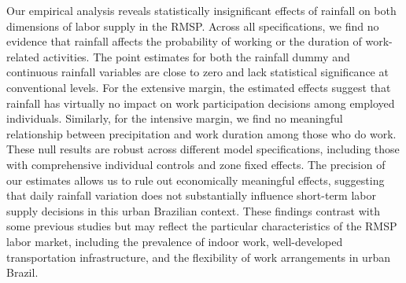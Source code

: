 Our empirical analysis reveals statistically insignificant effects of rainfall on both dimensions of labor supply in the RMSP. Across all specifications, we find no evidence that rainfall affects the probability of working or the duration of work-related activities. The point estimates for both the rainfall dummy and continuous rainfall variables are close to zero and lack statistical significance at conventional levels. For the extensive margin, the estimated effects suggest that rainfall has virtually no impact on work participation decisions among employed individuals. Similarly, for the intensive margin, we find no meaningful relationship between precipitation and work duration among those who do work. These null results are robust across different model specifications, including those with comprehensive individual controls and zone fixed effects. The precision of our estimates allows us to rule out economically meaningful effects, suggesting that daily rainfall variation does not substantially influence short-term labor supply decisions in this urban Brazilian context. These findings contrast with some previous studies but may reflect the particular characteristics of the RMSP labor market, including the prevalence of indoor work, well-developed transportation infrastructure, and the flexibility of work arrangements in urban Brazil.

